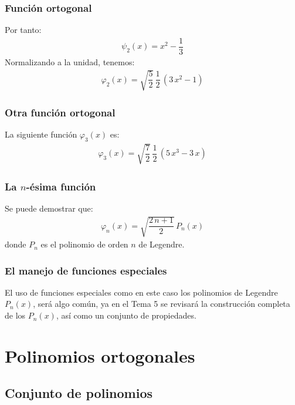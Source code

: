 \documentclass[12pt]{beamer}
\begin{document}
\begin{frame}
\frametitle{Función ortogonal}
Por tanto:
\pause
\begin{align}
\psi_{2} (x) = x^{2} - \dfrac{1}{3}
\label{eq:ecuacion_10_57}
\end{align}
\pause
Normalizando a la unidad, tenemos:
\begin{align}
\varphi_{2} (x) = \sqrt{\dfrac{5}{2}} \, \dfrac{1}{2} \, (3 \, x^{2} - 1)
\label{eq:ecuacion_10_58}
\end{align}
\end{frame}
\begin{frame}
\frametitle{Otra función ortogonal}
La siguiente función $\varphi_{3}(x)$ es:
\pause
\begin{align}
\varphi_{3} (x) = \sqrt{\dfrac{7}{2}} \, \dfrac{1}{2} \, (5 \, x^{3} - 3 \, x)
\label{eq:ecuacion_10_59}
\end{align}
\end{frame}
\begin{frame}
\frametitle{La $n$-ésima función}
Se puede demostrar que:
\pause
\begin{align}
\varphi_{n} (x) = \sqrt{\dfrac{2 \, n + 1}{2}} \, P_{n} (x)
\label{eq:ecuacion_10_60}
\end{align}
\pause
donde $P_{n}$ es el polinomio de orden $n$ de Legendre.
\end{frame}
\begin{frame}
\frametitle{El manejo de funciones especiales}
El uso de funciones especiales como en este caso los polinomios de Legendre $P_{n}(x)$, será algo común, ya en el Tema 5 se revisará la construcción completa de los $P_{n}(x)$, así como un conjunto de propiedades.
\end{frame}

\section{Polinomios ortogonales}
\subsection{Conjunto de polinomios}
\end{document}
